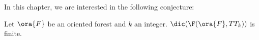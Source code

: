 






In this chapter, we are interested in the following conjecture:

\begin{conjecture}
    Let $\ora{F}$ be an oriented forest and $k$ an integer. $\dic(\F(\ora{F}, TT_{k}))$ is finite.
\end{conjecture}

